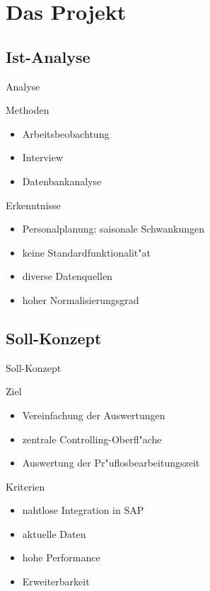\section{Das Projekt}
\subsection{Ist-Analyse}
\begin{frame}[<+->]{Analyse}
	\begin{block}{Methoden}
		\begin{itemize}[<+->]
			\item Arbeitsbeobachtung
			\item Interview
			\item Datenbankanalyse
		\end{itemize}
	\end{block}
	\begin{block}{Erkenntnisse}
		\begin{itemize}[<+->]
			\item Personalplanung: saisonale Schwankungen
			\item keine Standardfunktionalit"at
			\item diverse Datenquellen
			\item hoher Normalisierungsgrad
		\end{itemize}
	\end{block}
\end{frame}

\subsection{Soll-Konzept}
\begin{frame}[<+->]{Soll-Konzept}
	\begin{block}{Ziel}
		\begin{itemize}
			\item Vereinfachung der Auswertungen 
			\item zentrale Controlling-Oberfl"ache
			\item Auswertung der Pr"uflosbearbeitungszeit 
		\end{itemize}
	\end{block}
	
	\begin{block}{Kriterien}
		\begin{itemize}
			\item nahtlose Integration in SAP
			\item aktuelle Daten
			\item hohe Performance
			\item Erweiterbarkeit
		\end{itemize}
	\end{block}

\end{frame}

